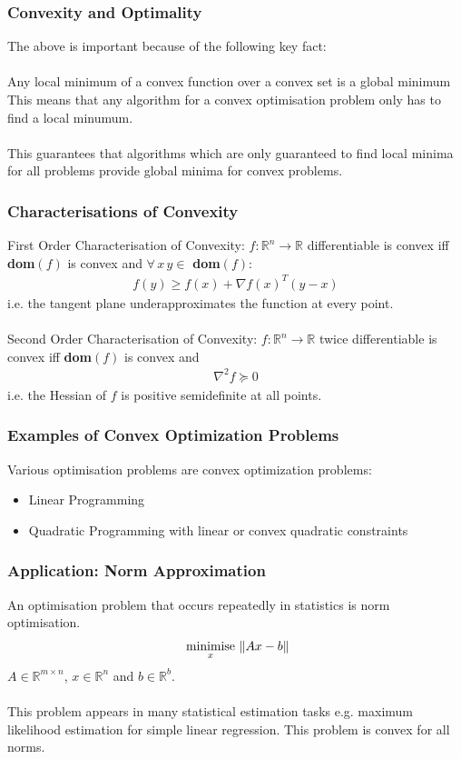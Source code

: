 \documentclass{beamer}
\DeclarePairedDelimiter\norm{\lVert}{\rVert}
\def\rnum{\mathbb{R}}
\begin{document}
\begin{frame}
    \frametitle{Convexity and Optimality}
    The above is important because of the following key fact:
    \\~\\
    Any local minimum of a convex function over a convex set is a global
    minimum
    This means that any algorithm for a convex optimisation problem only has to
    find a local minumum.
    \\~\\
    This guarantees that algorithms which are only
    guaranteed to find local minima for all problems provide global minima for
    convex problems.
\end{frame}

\begin{frame}
    \frametitle{Characterisations of Convexity}
    First Order Characterisation of Convexity: $f : \rnum^{n} \rightarrow \rnum$
    differentiable is convex iff \textbf{dom}$(f)$ is convex and $\forall \, x
    \, y \in$ \textbf{dom}$(f)$:
    \begin{align*}
        f(y) \geq f(x) + \nabla f(x)^{T}(y-x)
    \end{align*}
    i.e. the tangent plane underapproximates the function at every point.
    \\~\\
    Second Order Characterisation of Convexity: $f : \rnum^{n} \rightarrow
    \rnum$ twice differentiable is convex iff \textbf{dom}$(f)$ is convex and
    \begin{align*}
        \nabla^{2}f \succeq 0
    \end{align*}
    i.e. the Hessian of $f$ is positive semidefinite at all points.
\end{frame}

\begin{frame}
    \frametitle{Examples of Convex Optimization Problems}
    Various optimisation problems are convex optimization problems:
    \begin{itemize}
        \item Linear Programming
        \item Quadratic Programming with linear or convex quadratic constraints
    \end{itemize}
\end{frame}

\begin{frame}
    \frametitle{Application: Norm Approximation}
    An optimisation problem that occurs repeatedly in statistics is norm
    optimisation.
    \begin{align*}
        \underset{x}{\text{ minimise }}\norm{Ax - b}
    \end{align*}
    $A \in \rnum^{m\times n}$, $x \in \rnum^{n}$ and $b \in \rnum^{b}$.
    \\~\\
    This problem appears in many statistical estimation tasks e.g. maximum
    likelihood estimation for simple linear regression. This problem is convex
    for all norms. 
\end{frame}
\end{document}
